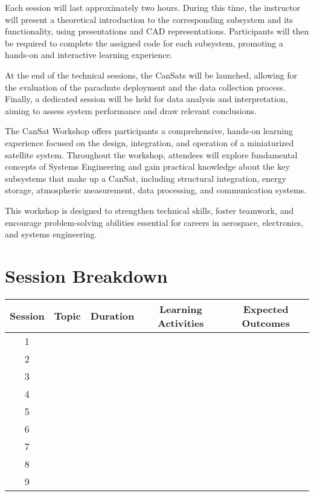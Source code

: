 \documentclass[a4paper,12pt]{article}
\begin{document}
Each session will last approximately two hours. During this time, the instructor will present a theoretical introduction to the corresponding subsystem and its functionality, using presentations and CAD representations. Participants will then be required to complete the assigned code for each subsystem, promoting a hands-on and interactive learning experience.

At the end of the technical sessions, the CanSats will be launched, allowing for the evaluation of the parachute deployment and the data collection process. Finally, a dedicated session will be held for data analysis and interpretation, aiming to assess system performance and draw relevant conclusions.

The CanSat Workshop offers participants a comprehensive, hands-on learning experience focused on the design, integration, and operation of a miniaturized satellite system. Throughout the workshop, attendees will explore fundamental concepts of Systems Engineering and gain practical knowledge about the key subsystems that make up a CanSat, including structural integration, energy storage, atmospheric measurement, data processing, and communication systems.

This workshop is designed to strengthen technical skills, foster teamwork, and encourage problem-solving abilities essential for careers in aerospace, electronics, and systems engineering.    

\newpage

\section{Session Breakdown}

\begin{table}[H]
\begin{tabular}{|c|c|c|c|c|}
\hline
Session & Topic & Duration  & Learning Activities  & Expected Outcomes \\ \hline
1 &  &  &  &  \\ \hline
2 &  &  &  &  \\ \hline
3 &  &  &  &  \\ \hline
4 &  &  &  &  \\ \hline
5 &  &  &  &  \\ \hline
6 &  &  &  &  \\ \hline
7 &  &  &  &  \\ \hline
8 &  &  &  &  \\ \hline
9 &  &  &  &  \\ \hline
\end{tabular}
\end{table}
\end{document}
